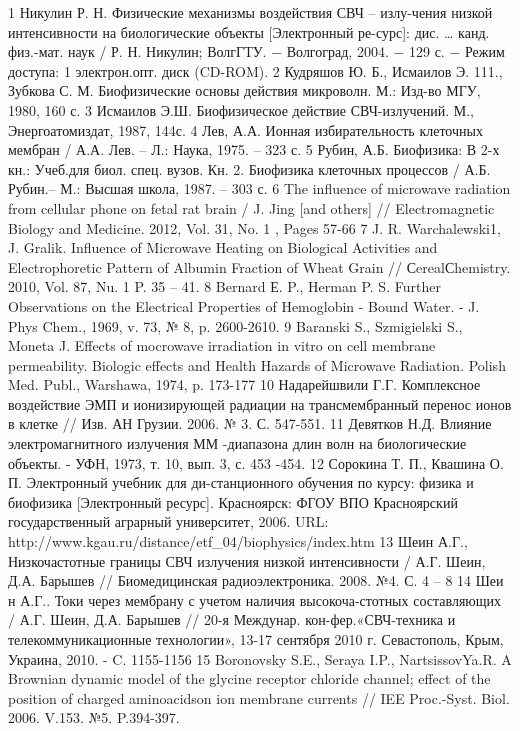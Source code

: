 \def\bibname{СПИСОК ИСПОЛЬЗОВАННЫХ ИСТОЧНИКОВ}
1	Никулин Р. Н. Физические механизмы воздействия СВЧ – излу-чения низкой интенсивности на биологические объекты [Электронный ре-сурс]: дис. … канд. физ.-мат. наук / Р. Н. Никулин; ВолгГТУ. − Волгоград, 2004. − 129 с. − Режим доступа: 1 электрон.опт. диск (CD-ROM).
2	Кудряшов Ю. Б., Исмаилов Э. 111., Зубкова С. М. Биофизические основы действия микроволн. М.: Изд-во МГУ, 1980, 160 с.
3	Исмаилов Э.Ш. Биофизическое действие СВЧ-излучений. М., Энергоатомиздат, 1987, 144с.
4	Лев, А.А. Ионная избирательность клеточных мембран / А.А. Лев. – Л.: Наука, 1975. – 323 с.
5	Рубин, А.Б. Биофизика: В 2-х кн.: Учеб.для биол. спец. вузов. Кн. 2. Биофизика клеточных процессов / А.Б. Рубин.– М.: Высшая школа, 1987. – 303 с.
6	The influence of microwave radiation from cellular phone on fetal rat brain / J. Jing [and others] // Electromagnetic Biology and Medicine. 2012, Vol. 31, No. 1 , Pages 57-66
7	 J. R. Warchalewski1, J. Gralik. Influence of Microwave Heating on Biological Activities and Electrophoretic Pattern of Albumin Fraction of Wheat Grain // СerealСhemistry. 2010, Vol. 87, Nu. 1 P. 35 – 41.
8	Bernard Е. P., Herman P. S. Further Observations on the Electrical Properties of Hemoglobin - Bound Water. - J. Phys Chem., 1969, v. 73, № 8, p. 2600-2610.
9	Baranski S., Szmigielski S., Moneta J. Effects of mocrowave irradiation in vitro on cell membrane permeability. Biologic effects and Health Hazards of Microwave Radiation. Polish Med. Publ., Warshawa, 1974, p. 173-177
10	Надарейшвили Г.Г. Комплексное воздействие ЭМП и ионизирующей радиации на трансмембранный перенос ионов в клетке // Изв. АН Грузии. 2006. № 3. С. 547-551.
11	Девятков Н.Д. Влияние электромагнитного излучения ММ -диапазона длин волн на биологические объекты. - УФН, 1973, т. 10, вып. 3, с. 453 -454.
12	Сорокина Т. П., Квашина О. П. Электронный учебник для ди-станционного обучения по курсу: физика и биофизика [Электронный ресурс]. Красноярск: ФГОУ ВПО Красноярский государственный аграрный университет, 2006. URL: http://www.kgau.ru/distance/etf_04/biophysics/index.htm
13	Шеин А.Г., Низкочастотные границы СВЧ излучения низкой интенсивности  / А.Г. Шеин, Д.А. Барышев // Биомедицинская радиоэлектроника. 2008. №4. С. 4 – 8
14	Шеи н А.Г..  Токи через мембрану с учетом наличия высокоча-стотных составляющих  / А.Г. Шеин, Д.А. Барышев // 20-я Междунар. кон-фер.«СВЧ-техника и телекоммуникационные технологии», 13-17 сентября 2010 г. Севастополь, Крым, Украина, 2010. - C. 1155-1156
15	Boronovsky S.E., Seraya I.P., NartsissovYa.R. A Brownian dynamic model of the glycine receptor chloride channel; effect of the position of charged aminoacidson ion membrane currents // IEE Proc.-Syst. Biol. 2006. V.153. №5. P.394-397.
